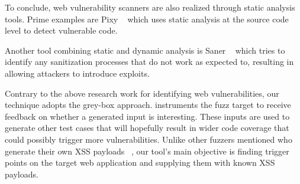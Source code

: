 To conclude, web vulnerability scanners are also realized through static analysis tools. Prime examples are Pixy ~\cite{jovanovic2006pixy} which uses static analysis at the source code
level to detect vulnerable code. 

Another tool combining static and dynamic analysis is Saner ~\cite{balzarotti2008saner} which tries to identify any sanitization processes that do not work as expected to, resulting in allowing attackers to introduce exploits.

Contrary to the above research work for identifying web vulnerabilities, our technique adopts the
grey-box approach. \pname{} instruments the fuzz target to receive feedback on whether a generated input is interesting. These inputs are used to generate other test cases that will hopefully result in wider code coverage that could possibly trigger more vulnerabilities. Unlike other fuzzers mentioned who generate their own XSS payloads ~\cite{duchene2014kameleonfuzz}, our tool's  main objective is finding trigger points on the target web application and supplying them with known XSS payloads.
